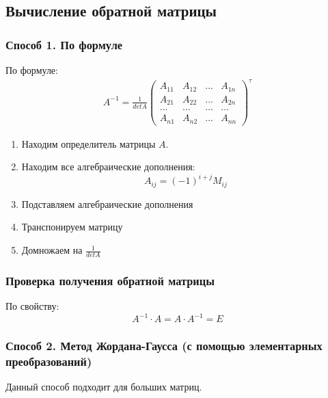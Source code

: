 \subsection{Вычисление обратной матрицы}

\subsubsection*{Способ 1. По формуле}

По формуле:
\begin{gather*}
  A^{-1} = \frac{1}{det A}
  \begin{pmatrix}
    A_{11} & A_{12} & \ldots & A_{1n} \\
    A_{21} & A_{22} & \ldots & A_{2n} \\
    \ldots & \ldots & \ldots & \ldots \\
    A_{n1} & A_{n2} & \ldots & A_{nn}
  \end{pmatrix}^{\tau}
\end{gather*}

\begin{enumerate}
  \item Находим определитель матрицы $A$.
  \item Находим все алгебраические дополнения: \[
      A_{ij} = (-1)^{i + j} M_{ij}
  \] 
  \item Подставляем алгебраические дополнения
  \item Транспонируем матрицу
  \item Домножаем на $\frac{1}{det A}$
\end{enumerate}

\subsubsection*{Проверка получения обратной матрицы}

По свойству: \[
  A^{-1} \cdot A = A \cdot A^{-1} = E
\] 

\subsubsection*{Способ 2. Метод Жордана-Гаусса (с помощью элементарных преобразований)}

Данный способ подходит для больших матриц.

